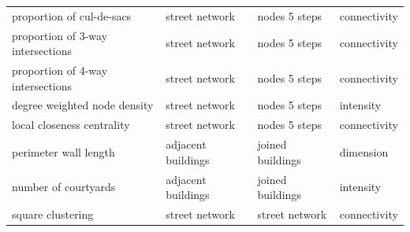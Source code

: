 \begin{longtable}{p{5cm}p{4cm}p{4cm}l}
            proportion of cul-de-sacs &                  street network &              nodes 5 steps & connectivity \\
    proportion of 3-way intersections &                  street network &              nodes 5 steps & connectivity \\
    proportion of 4-way intersections &                  street network &              nodes 5 steps & connectivity \\
        degree weighted node density &                  street network &              nodes 5 steps &    intensity \\
            local closeness centrality &                  street network &              nodes 5 steps & connectivity \\
                perimeter wall length &             adjacent buildings  &           joined buildings &    dimension \\
                number of courtyards &             adjacent buildings  &           joined buildings &    intensity \\
                    square clustering &                  street network &             street network & connectivity \\
\end{longtable}


